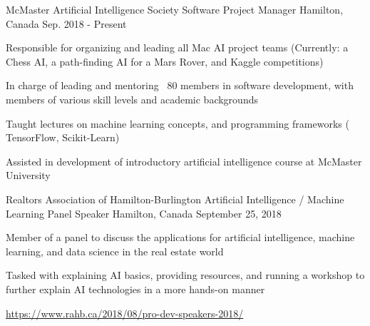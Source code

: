 



\begin{cventries}
\vspace{-2mm}
\cventry
  {McMaster Artificial Intelligence Society}
  {Software Project Manager}
  {Hamilton, Canada}
  {Sep. 2018 - Present}
  {
    \begin{cvitems}
      \item {Responsible for organizing and leading all Mac AI project teams (Currently: a Chess AI, a path-finding AI for a Mars Rover, and Kaggle competitions)}
      \item { In charge of leading and mentoring ~80 members in software development, with 
members of various skill levels and academic backgrounds}
      \item {Taught lectures on machine learning concepts, and programming frameworks ( TensorFlow, Scikit-Learn)}
      \item {Assisted in development of introductory artificial intelligence course at McMaster University}
      \end{cvitems} 
  }

\vspace{-2mm}
\cventry
    {Realtors Association of Hamilton-Burlington} %
    {Artificial Intelligence / Machine Learning Panel Speaker} %
    {Hamilton, Canada} %
    {September 25, 2018} %
    {
      \begin{cvitems} %
        \item {Member of a panel to discuss the applications for artificial intelligence, machine learning, and data science in the real estate world}
        \item {Tasked with explaining AI basics, providing resources, and running a workshop to further explain AI technologies in a more hands-on manner}
        \item {\url{https://www.rahb.ca/2018/08/pro-dev-speakers-2018/}}
      \end{cvitems}
    }
\end{cventries}
